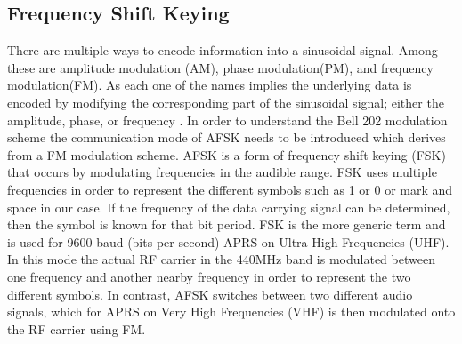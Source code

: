 \subsection{Frequency Shift Keying}
There are multiple ways to encode information into a sinusoidal signal. Among these are amplitude modulation (AM), phase modulation(PM), and frequency modulation(FM). As each one of the names implies the underlying data is encoded by modifying the corresponding part of the sinusoidal signal; either the amplitude, phase, or frequency \cite{Instruments2014}. In order to understand the Bell 202 modulation scheme the communication mode of AFSK needs to be introduced which derives from a FM modulation scheme. AFSK is a form of frequency shift keying (FSK) that occurs by modulating frequencies in the audible range. FSK uses multiple frequencies in order to represent the different symbols such as 1 or 0 or mark and space in our case. If the frequency of the data carrying signal can be determined, then the symbol is known for that bit period. FSK is the more generic term and is used for 9600 baud (bits per second) APRS on Ultra High Frequencies (UHF). In this mode the actual RF carrier in the 440MHz band is modulated between one frequency and another nearby frequency in order to represent the two different symbols. In contrast, AFSK switches between two different audio signals, which for APRS on Very High Frequencies (VHF) is then modulated onto the RF carrier using FM.


